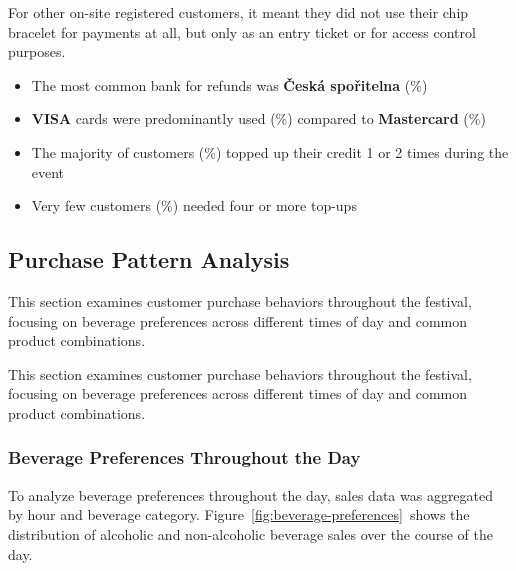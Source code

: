 For other on-site registered customers, it meant they did not use their chip bracelet for payments at all, but only as an entry ticket or for access control purposes.

\begin{keytakeaways}
	\begin{itemize}
		\item The most common bank for refunds was \textbf{Česká spořitelna} (\%)
		\item \textbf{VISA} cards were predominantly used (\%) compared to \textbf{Mastercard} (\%)
		\item The majority of customers (\%) topped up their credit 1 or 2 times during the event
		\item Very few customers (\%) needed four or more top-ups
	\end{itemize}
\end{keytakeaways}


\subsection{Purchase Pattern Analysis}
\label{subsec:analysis-customer-purchase-pattern}

This section examines customer purchase behaviors throughout the festival, focusing on beverage preferences across different times of day and common product combinations.

This section examines customer purchase behaviors throughout the festival, focusing on beverage preferences across different times of day and common product combinations.


\subsubsection{Beverage Preferences Throughout the Day}
\label{subsubsec:analysis-beverage-preferences}


To analyze beverage preferences throughout the day, sales data was aggregated by hour and beverage category.
Figure~\ref{fig:beverage-preferences}~shows the distribution of alcoholic and non-alcoholic beverage sales over the course of the day.

